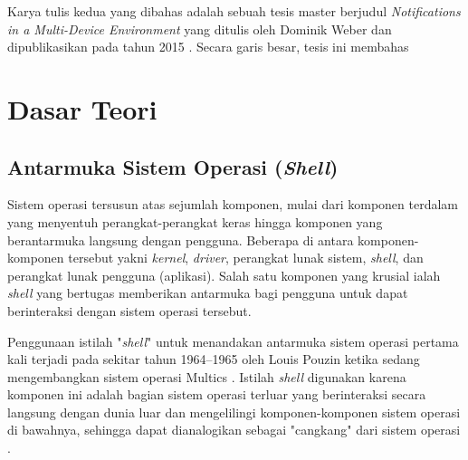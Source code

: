 Karya tulis kedua yang dibahas adalah sebuah tesis master berjudul \textit{Notifications in a Multi-Device Environment} yang ditulis oleh Dominik Weber dan dipublikasikan pada tahun 2015 \cite{weber2015notifications}. Secara garis besar, tesis ini membahas

\section{Dasar Teori}

\subsection{Antarmuka Sistem Operasi (\textit{Shell})}

Sistem operasi tersusun atas sejumlah komponen, mulai dari komponen terdalam yang menyentuh perangkat-perangkat keras hingga komponen yang berantarmuka langsung dengan pengguna. Beberapa di antara komponen-komponen tersebut yakni \textit{kernel}, \textit{driver}, perangkat lunak sistem, \textit{shell}, dan perangkat lunak pengguna (aplikasi). Salah satu komponen yang krusial ialah \textit{shell} yang bertugas memberikan antarmuka bagi pengguna untuk dapat berinteraksi dengan sistem operasi tersebut.

Penggunaan istilah "\textit{shell}" untuk menandakan antarmuka sistem operasi pertama kali terjadi pada sekitar tahun 1964--1965 oleh Louis Pouzin ketika sedang mengembangkan sistem operasi Multics \cite{origin-of-the-shell-name}. Istilah \textit{shell} digunakan karena komponen ini adalah bagian sistem operasi terluar yang berinteraksi secara langsung dengan dunia luar dan mengelilingi komponen-komponen sistem operasi di bawahnya, sehingga dapat dianalogikan sebagai "cangkang" dari sistem operasi \cite{shell-jargon-explanation}.

